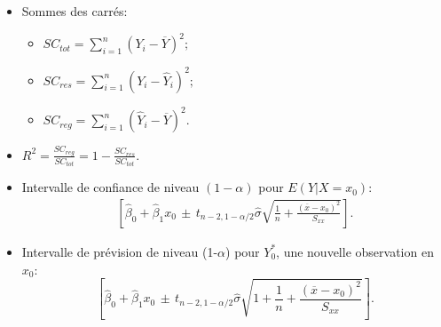 \documentclass[a4paper, 11pt]{article}
\begin{document}
\begin{itemize}
\item[$\bullet$]
Sommes des carrés:
\begin{itemize}
    \item $\displaystyle SC_{tot}=\sum_{i=1}^n (Y_i - \overline Y)^2;$
    \item $\displaystyle SC_{res}=\sum_{i=1}^n (Y_i - \widehat Y_i)^2;$
    \item $\displaystyle SC_{reg}=\sum_{i=1}^n (\widehat Y_i - \overline Y)^2.$
\end{itemize}

\item[$\bullet$] $\displaystyle R^2 =\frac{SC_{reg}} {SC_{tot}} =  1 - \frac{SC_{res}}{SC_{tot}}.$

\item[$\bullet$] Intervalle de confiance de niveau $(1-\alpha)$ pour $ E(Y | X = x_0)$:
\begin{eqnarray*}
\left[\widehat{\beta}_0 + \widehat{\beta}_1 x_0 \, \pm \, t_{n-2,1-\alpha/2} \widehat{\sigma} \sqrt{\frac{1}{n}+\frac{(\overline x-x_0)^2}{S_{xx}}}\right].
\end{eqnarray*}

\item[$\bullet$] 
Intervalle de prévision de niveau (1-$\alpha$) pour $Y_0^*$, une nouvelle observation en $x_0$:
$$\left[\widehat{\beta}_0 + \widehat{\beta}_1 x_0 \, \pm \, t_{n-2, 1-\alpha/2} \widehat{\sigma} \sqrt{1+\frac{1}{n}+\frac{(\overline x-x_0)^2}{S_{xx}}} \right].$$




\end{itemize}
\end{document}
